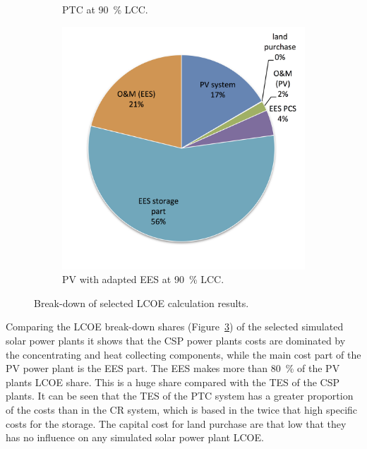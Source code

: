\begin{figure}[!htbp]
\begin{subfigure}[b]{0.5\textwidth}
                \caption{PTC at \SI{90}{\percent} LCC.}\label{PTC_LCOE_90_BreakDown}
        \end{subfigure}
\par\medskip %
        \begin{subfigure}[b]{0.5\textwidth}
                \centering
                \includegraphics[width=1\textwidth]{FIG/PV_LCOE_90_BreakDown}
                \caption{PV with adapted EES at \SI{90}{\percent} LCC.}\label{PV_LCOE_90_BreakDown}
        \end{subfigure}
        \caption[Break-down of selected LCOE calculation results.]{Break-down of selected LCOE calculation results.}\label{SMPV_LCOE_BreakDown}
\end{figure}
Comparing the LCOE break-down shares (Figure~\ref{SMPV_LCOE_BreakDown}) of the selected simulated solar power plants it shows that the CSP power plants costs are dominated by the concentrating and heat collecting components, while the main cost part of the PV power plant is the EES part. The EES makes more than \SI{80}{\percent} of the PV plants LCOE share. This is a huge share compared with the TES of the CSP plants. It can be seen that the TES of the PTC system has a greater proportion of the costs than in the CR system, which is based in the twice that high specific costs for the storage. The capital cost for land purchase are that low that they has no influence on any simulated solar power plant LCOE. 

